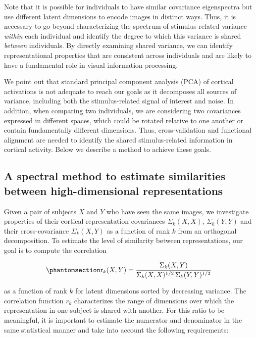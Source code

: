 \documentclass[10pt]{article}
\begin{document}
Note that it is possible for individuals to have similar covariance
eigenspectra but use different latent dimensions to encode images in
distinct ways. Thus, it is necessary to go beyond characterizing the
spectrum of stimulus-related variance \emph{within} each individual and
identify the degree to which this variance is shared \emph{between}
individuals. By directly examining shared variance, we can identify
representational properties that are consistent across individuals and
are likely to have a fundamental role in visual information processing.

We point out that standard principal component analysis (PCA) of
cortical activations is not adequate to reach our goals as it decomposes
all sources of variance, including both the stimulus-related signal of
interest and noise. In addition, when comparing two individuals, we are
considering two covariances expressed in different spaces, which could
be rotated relative to one another or contain fundamentally different
dimensions. Thus, cross-validation and functional alignment are needed
to identify the shared stimulus-related information in cortical
activity. Below we describe a method to achieve these goals.

\subsection{A spectral method to estimate similarities between
high-dimensional
representations}\label{a-spectral-method-to-estimate-similarities-between-high-dimensional-representations}

Given a pair of subjects \(X\) and \(Y\) who have seen the same images,
we investigate properties of their cortical representation covariances
\(\Sigma_k(X,X)\), \(\Sigma_k(Y,Y)\) and their cross-covariance
\(\Sigma_k(X,Y)\) as a function of rank \(k\) from an orthogonal
decomposition. To estimate the level of similarity between
representations, our goal is to compute the correlation

\begin{equation}\phantomsection\label{eq-correlation-coefficient}{
\mathrm{r}_k(X, Y) =  \frac{\Sigma_k(X,Y)}{\Sigma_k(X,X)^{1/2}\, \Sigma_k(Y,Y)^{1/2}}
}\end{equation}

as a function of rank \(k\) for latent dimensions sorted by decreasing
variance. The correlation function \(r_k\) characterizes the range of
dimensions over which the representation in one subject is shared with
another. For this ratio to be meaningful, it is important to estimate
the numerator and denominator in the same statistical manner and take
into account the following requirements:
\end{document}
